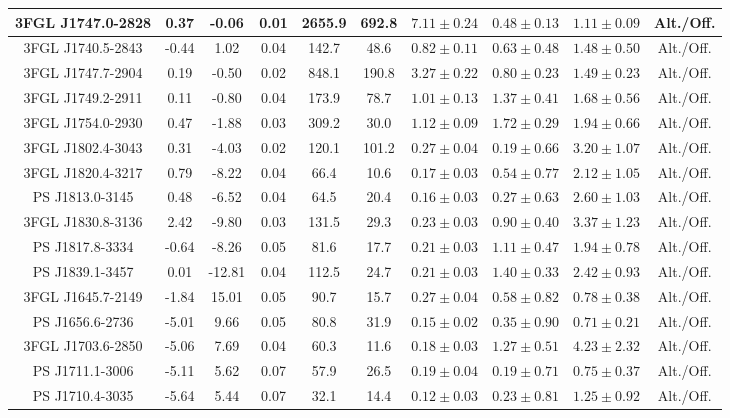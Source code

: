 \begin{table*}
\begin{tabular}{|c|c|c|c|c|c|c|c|c|c|}
\hline 
 3FGL J1747.0-2828 & 0.37 & -0.06 & 0.01 & 2655.9 & 692.8 & $7.11\pm0.24$ & $0.48\pm0.13$ & $1.11\pm0.09$ & Alt./Off.\\
\hline 
 3FGL J1740.5-2843 & -0.44 & 1.02 & 0.04 & 142.7 & 48.6 & $0.82\pm0.11$ & $0.63\pm0.48$ & $1.48\pm0.50$ & Alt./Off.\\
\hline 
 3FGL J1747.7-2904 & 0.19 & -0.50 & 0.02 & 848.1 & 190.8 & $3.27\pm0.22$ & $0.80\pm0.23$ & $1.49\pm0.23$ & Alt./Off.\\
\hline 
 3FGL J1749.2-2911 & 0.11 & -0.80 & 0.04 & 173.9 & 78.7 & $1.01\pm0.13$ & $1.37\pm0.41$ & $1.68\pm0.56$ & Alt./Off.\\
\hline 
 3FGL J1754.0-2930 & 0.47 & -1.88 & 0.03 & 309.2 & 30.0 & $1.12\pm0.09$ & $1.72\pm0.29$ & $1.94\pm0.66$ & Alt./Off.\\
\hline 
 3FGL J1802.4-3043 & 0.31 & -4.03 & 0.02 & 120.1 & 101.2 & $0.27\pm0.04$ & $0.19\pm0.66$ & $3.20\pm1.07$ & Alt./Off.\\
\hline 
 3FGL J1820.4-3217 & 0.79 & -8.22 & 0.04 & 66.4 & 10.6 & $0.17\pm0.03$ & $0.54\pm0.77$ & $2.12\pm1.05$ & Alt./Off.\\
\hline 
 PS J1813.0-3145 & 0.48 & -6.52 & 0.04 & 64.5 & 20.4 & $0.16\pm0.03$ & $0.27\pm0.63$ & $2.60\pm1.03$ & Alt./Off.\\
\hline 
 3FGL J1830.8-3136 & 2.42 & -9.80 & 0.03 & 131.5 & 29.3 & $0.23\pm0.03$ & $0.90\pm0.40$ & $3.37\pm1.23$ & Alt./Off.\\
\hline 
 PS J1817.8-3334 & -0.64 & -8.26 & 0.05 & 81.6 & 17.7 & $0.21\pm0.03$ & $1.11\pm0.47$ & $1.94\pm0.78$ & Alt./Off.\\
\hline 
 PS J1839.1-3457 & 0.01 & -12.81 & 0.04 & 112.5 & 24.7 & $0.21\pm0.03$ & $1.40\pm0.33$ & $2.42\pm0.93$ & Alt./Off.\\
\hline 
 3FGL J1645.7-2149 & -1.84 & 15.01 & 0.05 & 90.7 & 15.7 & $0.27\pm0.04$ & $0.58\pm0.82$ & $0.78\pm0.38$ & Alt./Off.\\
\hline 
 PS J1656.6-2736 & -5.01 & 9.66 & 0.05 & 80.8 & 31.9 & $0.15\pm0.02$ & $0.35\pm0.90$ & $0.71\pm0.21$ & Alt./Off.\\
\hline 
 3FGL J1703.6-2850 & -5.06 & 7.69 & 0.04 & 60.3 & 11.6 & $0.18\pm0.03$ & $1.27\pm0.51$ & $4.23\pm2.32$ & Alt./Off.\\
\hline 
 PS J1711.1-3006 & -5.11 & 5.62 & 0.07 & 57.9 & 26.5 & $0.19\pm0.04$ & $0.19\pm0.71$ & $0.75\pm0.37$ & Alt./Off.\\
\hline 
 PS J1710.4-3035 & -5.64 & 5.44 & 0.07 & 32.1 & 14.4 & $0.12\pm0.03$ & $0.23\pm0.81$ & $1.25\pm0.92$ & Alt./Off.\\

\end{tabular}
\end{table*}
